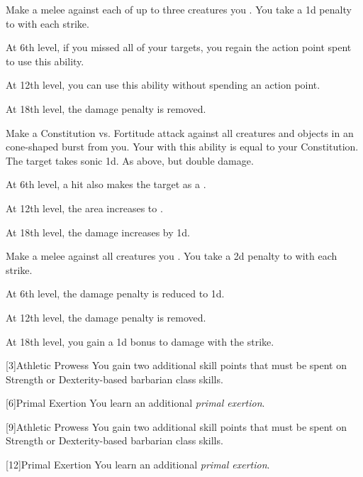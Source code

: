 {             Make a melee  against each of up to three creatures you .
            You take a \minus1d penalty to  with each strike.
            \par At 6th level, if you missed all of your targets, you regain the action point spent to use this ability.
            \par At 12th level, you can use this ability without spending an action point.
            \par At 18th level, the damage penalty is removed.

             Make a Constitution vs. Fortitude attack against all creatures and objects in an \areamed cone-shaped burst from you.
            Your  with this ability is equal to your Constitution.
             The target takes sonic  \minus1d.
             As above, but double damage.
            \par At 6th level, a hit also makes the target  as a .
            \par At 12th level, the area increases to \arealarge.
            \par At 18th level, the damage increases by \plus1d.

             Make a melee  against all creatures you .
            You take a \minus2d penalty to  with each strike.
            \par At 6th level, the damage penalty is reduced to \minus1d.
            \par At 12th level, the damage penalty is removed.
            \par At 18th level, you gain a \plus1d bonus to damage with the strike.
        }

        [3]{Athletic Prowess} You gain two additional skill points that must be spent on Strength or Dexterity-based barbarian class skills.

        [6]{Primal Exertion}
        You learn an additional \textit{primal exertion}.

        [9]{Athletic Prowess} You gain two additional skill points that must be spent on Strength or Dexterity-based barbarian class skills.

        [12]{Primal Exertion}
        You learn an additional \textit{primal exertion}.

